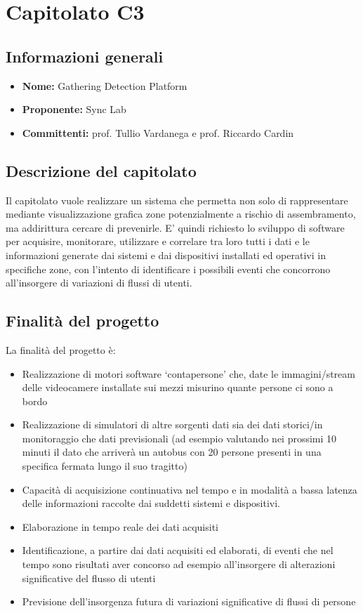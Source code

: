 \section{Capitolato C3}

\subsection{Informazioni generali}
\begin{itemize}
\item \textbf{Nome:}  Gathering Detection Platform 
\item \textbf{Proponente:} Sync Lab 
\item \textbf{Committenti:} prof. Tullio Vardanega e prof. Riccardo Cardin
\end{itemize}

\subsection{Descrizione del capitolato}
Il capitolato vuole realizzare un sistema che permetta non solo di rappresentare mediante visualizzazione grafica zone potenzialmente a rischio di assembramento, ma addirittura cercare di prevenirle. E' quindi richiesto lo sviluppo di software per acquisire, monitorare, utilizzare e correlare tra loro tutti i dati e le informazioni generate dai sistemi e dai dispositivi installati ed operativi in specifiche zone, con l'intento di identificare i possibili eventi che concorrono all'insorgere di variazioni di flussi di utenti. 
\subsection{Finalità del progetto}
La finalità del progetto è:
\begin{itemize}
\item Realizzazione di motori software ‘contapersone’ che, date le immagini/stream delle videocamere installate sui mezzi misurino quante persone ci sono a bordo
\item Realizzazione di simulatori di altre sorgenti dati sia dei dati storici/in monitoraggio che dati previsionali
(ad esempio valutando nei prossimi 10 minuti il dato che arriverà un autobus con 20 persone presenti
in una specifica fermata lungo il suo tragitto)
\item Capacità di acquisizione continuativa nel tempo e in modalità a bassa latenza delle informazioni
raccolte dai suddetti sistemi e dispositivi.
\item Elaborazione in tempo reale dei dati acquisiti
\item Identificazione, a partire dai dati acquisiti ed elaborati, di eventi che nel tempo sono risultati aver
concorso ad esempio all'insorgere di alterazioni significative del flusso di utenti
\item Previsione dell'insorgenza futura di variazioni significative di flussi di persone
\end{itemize}

